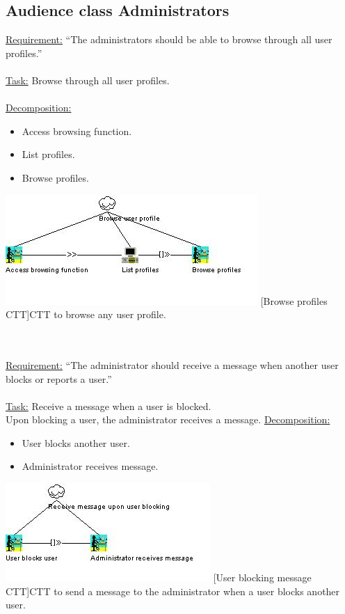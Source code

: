 \documentclass[11pt, a4paper,svglistings,oneside]{book}
\begin{document}
\subsection{Audience class Administrators}
\underline{Requirement:} ``The administrators should be able to browse through all user profiles.'' \\ \\
\underline{Task:} Browse through all user profiles. \\ \\
\underline{Decomposition:}
\begin{itemize}
\item Access browsing function.
\item List profiles.
\item Browse profiles.
\end{itemize}
\noindent\begin{minipage}{\textwidth}
    \centering
   \includegraphics{CTT_Browse.png}
 [Browse profiles CTT]{CTT to browse any user profile.}
\end{minipage}
$\;$ \\ \\
\underline{Requirement:} ``The administrator should receive a message when another user blocks or reports a user.'' \\ \\
\underline{Task:} Receive a message when a user is blocked. \\
Upon blocking a user, the administrator receives a message.
\underline{Decomposition:}
\begin{itemize}
\item User blocks another user.
\item Administrator receives message.
\end{itemize}
\noindent\begin{minipage}{\textwidth}
    \centering
   \includegraphics{CTT_Admin_Message.png}
 [User blocking message CTT]{CTT to send a message to the administrator when a user blocks another user.}
\end{minipage}
\end{document}
